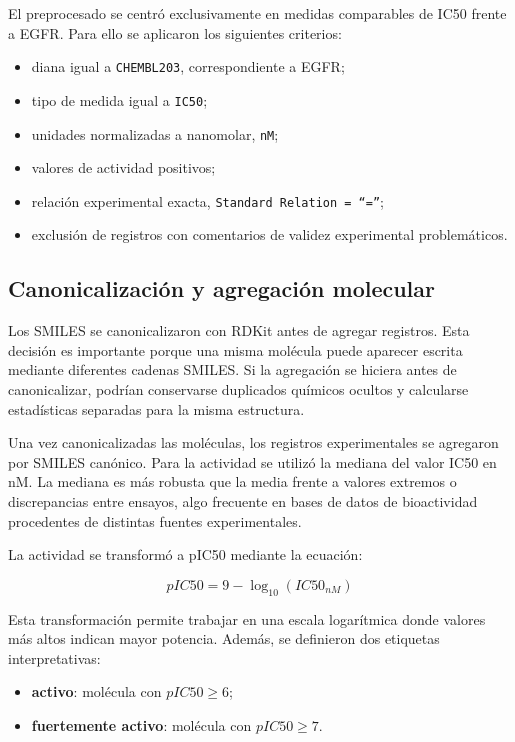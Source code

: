 \documentclass[IB]{TFUOC}%
\begin{document}
El preprocesado se centró exclusivamente en medidas comparables de IC50 frente a EGFR. Para ello se aplicaron los siguientes criterios:

\begin{itemize}
    \item diana igual a \texttt{CHEMBL203}, correspondiente a EGFR;
    \item tipo de medida igual a \texttt{IC50};
    \item unidades normalizadas a nanomolar, \texttt{nM};
    \item valores de actividad positivos;
    \item relación experimental exacta, \texttt{Standard Relation = ``=''};
    \item exclusión de registros con comentarios de validez experimental problemáticos.
\end{itemize}


\subsection{Canonicalización y agregación molecular}

Los SMILES se canonicalizaron con RDKit antes de agregar registros. Esta decisión es importante porque una misma molécula puede aparecer escrita mediante diferentes cadenas SMILES. Si la agregación se hiciera antes de canonicalizar, podrían conservarse duplicados químicos ocultos y calcularse estadísticas separadas para la misma estructura.

Una vez canonicalizadas las moléculas, los registros experimentales se agregaron por SMILES canónico. Para la actividad se utilizó la mediana del valor IC50 en nM. La mediana es más robusta que la media frente a valores extremos o discrepancias entre ensayos, algo frecuente en bases de datos de bioactividad procedentes de distintas fuentes experimentales.

La actividad se transformó a pIC50 mediante la ecuación:

\begin{equation}
    pIC50 = 9 - \log_{10}(IC50_{nM})
\end{equation}

Esta transformación permite trabajar en una escala logarítmica donde valores más altos indican mayor potencia. Además, se definieron dos etiquetas interpretativas:

\begin{itemize}
    \item \textbf{activo}: molécula con $pIC50 \geq 6$;
    \item \textbf{fuertemente activo}: molécula con $pIC50 \geq 7$.
\end{itemize}
\end{document}
